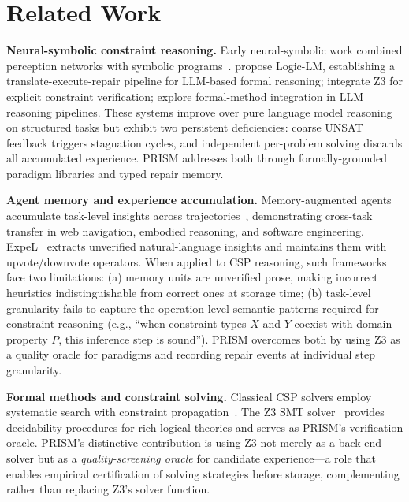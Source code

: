 
\section{Related Work}
\label{sec:related}

\textbf{Neural-symbolic constraint reasoning.} Early neural-symbolic work combined perception networks with symbolic programs~\citep{Mao2019,Yi2019}. \citet{Pan2023} propose Logic-LM, establishing a translate-execute-repair pipeline for LLM-based formal reasoning; \citet{Olausson2023} integrate Z3 for explicit constraint verification; \citet{Ye2023} explore formal-method integration in LLM reasoning pipelines. These systems improve over pure language model reasoning on structured tasks but exhibit two persistent deficiencies: coarse UNSAT feedback triggers stagnation cycles, and independent per-problem solving discards all accumulated experience. PRISM addresses both through formally-grounded paradigm libraries and typed repair memory.

\textbf{Agent memory and experience accumulation.} Memory-augmented agents accumulate task-level insights across trajectories~\citep{Shinn2023,Zhao2024,Ouyang2025}, demonstrating cross-task transfer in web navigation, embodied reasoning, and software engineering. ExpeL~\citep{Zhao2024} extracts unverified natural-language insights and maintains them with upvote/downvote operators. When applied to CSP reasoning, such frameworks face two limitations: (a) memory units are unverified prose, making incorrect heuristics indistinguishable from correct ones at storage time; (b) task-level granularity fails to capture the operation-level semantic patterns required for constraint reasoning (e.g., ``when constraint types $X$ and $Y$ coexist with domain property $P$, this inference step is sound''). PRISM overcomes both by using Z3 as a quality oracle for paradigms and recording repair events at individual step granularity.

\textbf{Formal methods and constraint solving.} Classical CSP solvers employ systematic search with constraint propagation~\citep{Dechter2003,Russell2021}. The Z3 SMT solver~\citep{DeMoura2008} provides decidability procedures for rich logical theories and serves as PRISM's verification oracle. PRISM's distinctive contribution is using Z3 not merely as a back-end solver but as a \textit{quality-screening oracle} for candidate experience—a role that enables empirical certification of solving strategies before storage, complementing rather than replacing Z3's solver function.

